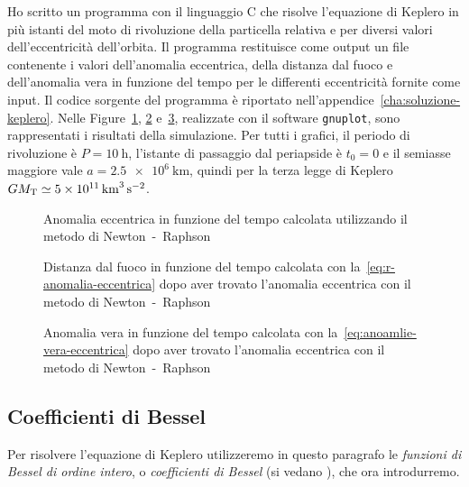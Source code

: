 Ho scritto un programma con il linguaggio C che risolve l'equazione di Keplero
in più istanti del moto di rivoluzione della particella relativa e per diversi
valori dell'eccentricità dell'orbita. Il programma restituisce come output un
file contenente i valori dell'anomalia eccentrica, della distanza dal fuoco e
dell'anomalia vera in funzione del tempo per le differenti eccentricità fornite
come input. Il codice sorgente del programma è riportato
nell'appendice~\ref{cha:soluzione-keplero}. Nelle
Figure~\ref{fig:newton-anomalia_eccentrica}, \ref{fig:newton-raggio}
e~\ref{fig:newton-anomalia_vera}, realizzate con il software \verb|gnuplot|,
sono rappresentati i risultati della simulazione. Per tutti i grafici, il
periodo di rivoluzione è $P = \SI{10}{\hour}$, l'istante di passaggio dal
periapside è $t_0 = 0$ e il semiasse maggiore vale $a =
\SI{2.5e6}{\kilo\metre}$,
quindi per la terza legge di Keplero
$GM_\textup{T} \simeq \SI{5e11}{\cubic\kilo\metre\per\square\second}$.
\begin{figure}
  \centering
  
  \caption[Anomalia eccentrica in funzione del tempo con il metodo di
  Newton]{Anomalia eccentrica in funzione del tempo calcolata
    utilizzando il metodo di Newton~-~Raphson}
  \label{fig:newton-anomalia_eccentrica}
\end{figure}
\begin{figure}
  \centering
  
  \caption[Distanza dal fuoco in funzione del tempo con il metodo di
  Newton]{Distanza dal fuoco in funzione del tempo calcolata con
    la~\eqref{eq:r-anomalia-eccentrica} dopo aver trovato l'anomalia eccentrica
    con il metodo di Newton~-~Raphson}
  \label{fig:newton-raggio}
\end{figure}
\begin{figure}
  \centering
  
  \caption[Anomalia vera in funzione del tempo con il metodo di
  Newton]{Anomalia vera in funzione del tempo calcolata con
    la~\eqref{eq:anoamlie-vera-eccentrica} dopo aver trovato l'anomalia
    eccentrica con il metodo di Newton~-~Raphson}
  \label{fig:newton-anomalia_vera}
\end{figure}

\subsection{Coefficienti di Bessel}
\label{sec:bessel}

Per risolvere l'equazione di Keplero utilizzeremo in questo paragrafo le
\emph{funzioni di Bessel di ordine intero}, o \emph{coefficienti di
  Bessel} (si vedano \textcites{abramowitz:handbook}{watson:bessel}%
{whittaker:modern-analysis}), che ora introdurremo.

